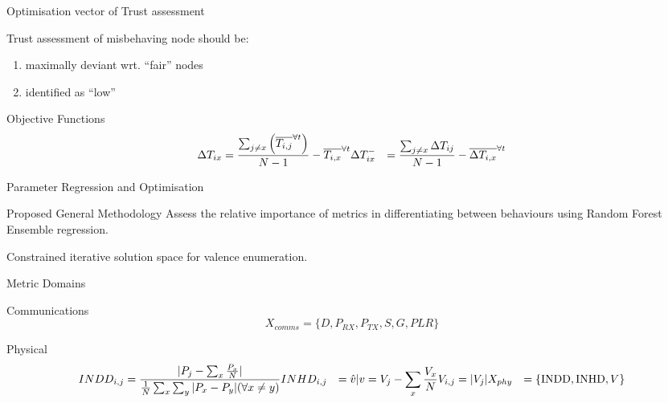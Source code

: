 \documentclass[aspectratio=169]{beamer}
\let\\\space
\begin{document}
\begin{frame}{Optimisation vector of Trust assessment}
  \begin{block}{Trust assessment of misbehaving node should be:}
    \begin{enumerate}
      \item maximally deviant wrt. ``fair'' nodes
      \item identified as ``low''
    \end{enumerate}
  \end{block}
  \pause
  \begin{block}{Objective Functions}
    \begin{align}
      \Delta T_{ix} &= \frac{\sum_{j\neq x}\left( \overline{T_{i,j}}^{\forall t}\right)}{N-1} - \overline{T_{i,x}}^{\forall t} \label{eq:delta_t}\\
      \Delta T_{ix}^- &= \frac{\sum_{j\neq x} \Delta T_{ij}}{N-1} - \overline{\Delta T_{i,x}}^{\forall t} \label{eq:delta_t_minus} 
    \end{align}

  \end{block}
\end{frame}

\begin{frame}{Parameter Regression and Optimisation}
  \begin{block}{Proposed General Methodology}
    Assess the relative importance of metrics in differentiating between behaviours using Random Forest Ensemble regression.

    Constrained iterative solution space for valence enumeration.
  \end{block}
\end{frame}


\begin{frame}{Metric Domains}
  \begin{block}{Communications}
    \begin{equation}
      X_{comms}=\{D, P_{RX}, P_{TX}, S, G, PLR\}
    \end{equation}
  \end{block}

  \pause
  \begin{block}{Physical}
    \begin{align}
      \centering
      INDD_{i,j} &= \frac{|P_j - \sum_x \frac{P_x}{N}|}{\frac{1}{N}\sum_x \sum_y{|P_x - P_y| (\forall x \neq y)}}\\
      INHD_{i,j} &= \hat{v} \vert v= V_j - \sum_x{\frac{V_x}{N}}\\
      V_{i,j} &= |V_j|\\
      X_{phy}&=\{\text{INDD}, \text{INHD}, V\}
    \end{align}
  \end{block}

\end{frame}
\end{document}
